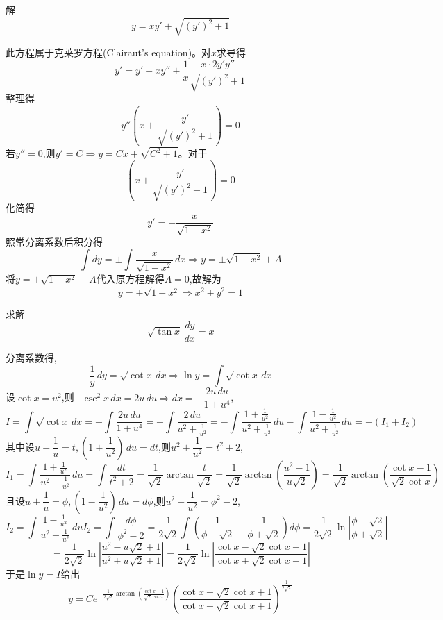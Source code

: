 \begin{questions}
    \question 解
    \[
    y = xy' + \sqrt{(y')^2 + 1}
    \]
    \begin{solution}
        此方程属于克莱罗方程(Clairaut's equation)。对$x$求导得
        \[
        y' = y' + xy'' + \frac{1}{x} \frac{x \cdot 2y'y''}{\sqrt{(y')^2 + 1}}
        \]
        整理得
        \[
        y'' \left(x + \frac{y'}{\sqrt{(y')^2 + 1}}\right) = 0
        \]
        若$y''=0$,则$y'=C \Rightarrow y=Cx+\sqrt{C^2+1}$。对于
        \[
        \left(x + \frac{y'}{\sqrt{(y')^2 + 1}}\right) = 0
        \]
        化简得
        \[
        y'=\pm\frac{x}{\sqrt{1-x^2}}
        \]
        照常分离系数后积分得
        \[
        \int dy = \pm \int \frac{x}{\sqrt{1-x^2}} \, dx \Rightarrow y= \pm \sqrt{1-x^2}+A
        \]
        将$y=\pm\sqrt{1-x^2}+A$代入原方程解得$A=0$,故解为
        \[
        y=\pm\sqrt{1-x^2} \Rightarrow x^2+y^2=1
        \]
    \end{solution}

    \question 求解
    \[
    \sqrt{\tan x} \,\frac{dy}{dx}=x
    \]
    \begin{solution}
        分离系数得,
        \[
        \frac{1}{y} \,dy =\sqrt{\cot x}\,dx \Rightarrow \ln y = \int \sqrt{\cot x} \,dx
        \]
        设$\cot x=u^2$,则$-\csc^2 x \,dx=2u\,du \Rightarrow dx=-\dfrac{2u\,du}{1+u^4}$,
        \[
        I=\int \sqrt{\cot x} \,dx=-\int \frac{2u\,du}{1+u^4}=-\int \frac{2\,du}{u^2+\frac{1}{u^2}}= - \int \frac{1 + \frac{1}{u^2}}{u^2 + \frac{1}{u^2}}\, du - \int \frac{1 - \frac{1}{u^2}}{u^2 + \frac{1}{u^2}}\, du=-(I_1+I_2)
        \]
        其中设$u-\dfrac{1}{u}=t,\left(1+\dfrac{1}{u^2}\right)\,du=dt$,则$u^2 + \dfrac{1}{u^2} = t^2 + 2$,
        \[
        I_1=\int \frac{1 + \frac{1}{u^2}}{u^2 + \frac{1}{u^2}}\, du= \int \frac{dt}{t^2 + 2} = \frac{1}{\sqrt{2}} \arctan \frac{t}{\sqrt{2}}= \frac{1}{\sqrt{2}} \arctan \left(\frac{u^2 - 1}{u\sqrt{2}}\right)
        = \frac{1}{\sqrt{2}} \arctan \left(\frac{\cot x - 1}{\sqrt{2} \cot x}\right)
        \]
        且设$u+\dfrac{1}{u}=\phi,\left(1-\dfrac{1}{u^2}\right)\,du=d\phi$,则$u^2 + \dfrac{1}{u^2} = \phi^2 - 2$,
        \[
        I_2=\int \frac{1 - \frac{1}{u^2}}{u^2 + \frac{1}{u^2}}\, du
        I_2 = \int \frac{d\phi}{\phi^2 - 2}
        = \frac{1}{2\sqrt{2}} \int \left(\frac{1}{\phi - \sqrt{2}} - \frac{1}{\phi + \sqrt{2}}\right) d\phi
        = \frac{1}{2\sqrt{2}} \ln \left|\frac{\phi - \sqrt{2}}{\phi + \sqrt{2}}\right|
        \]
        \[
        = \frac{1}{2\sqrt{2}} \ln \left| \frac{u^2 - u\sqrt{2} + 1}{u^2 + u\sqrt{2} + 1} \right| = \frac{1}{2\sqrt{2}} \ln \left| \frac{\cot x - \sqrt{2}\cot x + 1}{\cot x + \sqrt{2}\cot x + 1} \right|
        \]
        于是$\ln y=I$给出
        \[
        y = Ce^{\displaystyle -\frac{1}{2\sqrt{2}} \arctan\left(\frac{\cot x - 1}{\sqrt{2} \cot x}\right)} \left(\frac{\cot x + \sqrt{2}\cot x + 1}{\cot x - \sqrt{2}\cot x + 1}\right)^{\frac{1}{2\sqrt{2}}}
        \]
    \end{solution}


\end{questions}
